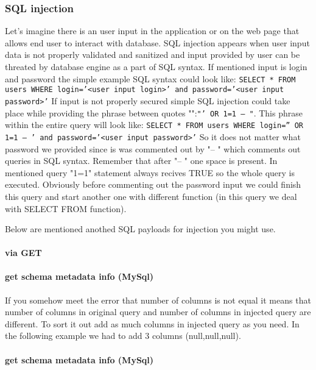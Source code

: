\subsubsection{SQL injection}
Let's imagine there is an user input in the application or on the web page that allows end user to interact with database.
SQL injection appears when
user input data is not properly validated and sanitized and input provided by user can be threated by database engine as a part of SQL syntax.
If mentioned input is login and password the simple example SQL syntax could look like:
\newline
\texttt{SELECT * FROM users WHERE login='<user input login>' and password='<user input password>'}
\newline
If input is not properly secured simple SQL injection could take place while providing the phrase between quotes "":\texttt{"' OR 1=1 -- "}.
This phrase within the entire query will look like:
\newline
\texttt{SELECT * FROM users WHERE login='' OR 1=1 -- ' and password='<user input password>'}
So it does not matter what password we provided since is was commented out by "-- " which comments out queries in SQL syntax.
Remember that after "-- " one space is present.
In mentioned query "1=1" statement always recives TRUE so the whole query is executed.
Obviously before commenting out the password input we could finish this query and start another one with different function (in this query we deal with SELECT FROM function).

Below are mentioned anothed SQL payloads for injection you might use.
\paragraph{via GET} 
\paragraph{get schema metadata info (MySql)} 
If you somehow meet the error that number of columns is not equal it means that number of columns in original query and number of columns in injected query are different.
To sort it out add as much columns in injected query as you need.
In the following example we had to add 3 columns (null,null,null).
\paragraph{get schema metadata info (MySql)} 

